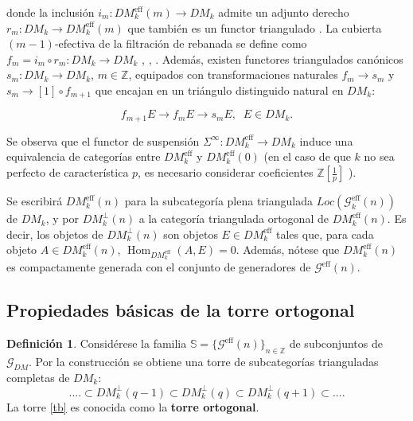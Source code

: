 \documentclass[10pt]{amsart}
\theoremstyle{definition}
\newtheorem{definition}{Definici\'on}[section]
\theoremstyle{remark}
\theoremstyle{definition}
\begin{document}
donde la inclusión $i_{m}:DM^{\textrm{eff}}_{k}(m)\to DM_{k}$ admite un adjunto derecho $r_{m}:DM_{k}\to DM^{\textrm{eff}}_{k}(m)$ que también es un functor triangulado \cite[Thm. 4.1]{Nee96}. La cubierta $(m-1)$-efectiva de la filtración de rebanada se define como $f_{m}=i_{m}\circ r_{m}:DM_{k}\to DM_{k}$ \cite{Voe02b}, \cite[p. 18]{Voe10b}, \cite{HK06}. Además, existen functores triangulados canónicos $s_{m}:DM_{k}\to DM_{k}$, $m\in\mathbb{Z}$, equipados con transformaciones naturales $f_{m}\to s_{m}$ y $s_{m}\rightarrow[1]\circ f_{m+1}$ que encajan en un triángulo distinguido natural en $DM_{k}$:

\begin{equation}\label{GM4}
f_{m+1}E\to f_{m}E\to s_{m}E,\;\;E\in DM_{k}.
\end{equation}

Se observa que el functor de suspensión $\Sigma^{\infty}:DM^{\textrm{eff}}_{k}\to DM_{k}$ induce una equivalencia de categorías entre $DM^{\textrm{eff}}_{k}$ y $DM^{\textrm{eff}}_{k}(0)$ \cite[Cor. 4.10]{Voe10a} (en el caso de que $k$ no sea perfecto de característica $p$, es necesario considerar coeficientes $\mathbb{Z}[\frac{1}{p}]$ \cite[Sus17, Thm. 4.12 and Thm. 5.1]{Sus17}).


Se escribirá $DM^{\textrm{eff}}_{k}(n)$ para la subcategoría plena triangulada $Loc(\mathcal{G}^{\textrm{eff}}_{k}(n))$ de $DM_{k}$, y por $DM^{\perp}_{k}(n)$ a la categoría triangulada ortogonal de $DM^{\textrm{eff}}_{k}(n)$. Es decir, los objetos de $DM^{\perp}_{k}(n)$ son objetos $E \in DM^{\textrm{eff}}_{k}$ tales que, para cada objeto $A \in DM^{\textrm{eff}}_{k}(n)$, $\operatorname{Hom}_{DM^{\textrm{eff}}_{k}}(A,E)=0$. Además, nótese que $DM^{\textrm{eff}}_{k}(n)$ es compactamente generada con el conjunto de generadores de $\mathcal{G}^{\textrm{eff}}(n)$.

\subsection{Propiedades básicas de la torre ortogonal}

\begin{definition}
Considérese la familia $\mathbb{S}=\{\mathcal{G}^{\textrm{eff}}(n)\}_{n\in\mathbb{Z}}$ de subconjuntos de $\mathcal{G}_{DM}$. Por la construcción se obtiene una torre de subcategorías trianguladas completas de $DM_{k}$:
\begin{equation*}\label{tb}
....\subset DM^{\perp}_{k}(q-1) \subset DM^{\perp}_{k}(q) \subset DM^{\perp}_{k}(q+1) \subset ....
\end{equation*}
La torre \ref{tb} es conocida como la \textbf{torre ortogonal}.
\end{definition}
\end{document}
